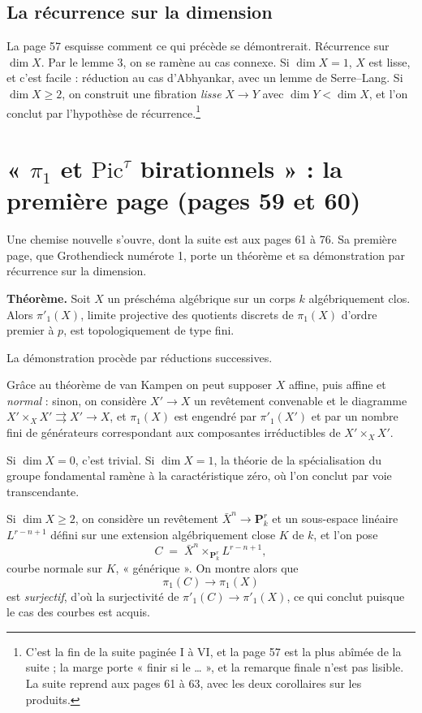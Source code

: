 \documentclass[11pt,a4paper]{article}
\begin{document}
\subsection*{La récurrence sur la dimension}

La page 57 esquisse comment ce qui précède se démontrerait. Récurrence sur
$\dim X$. Par le lemme 3, on se ramène au cas connexe. Si $\dim X = 1$, $X$ est
lisse, et c'est facile : réduction au cas d'Abhyankar, avec un lemme de
Serre--Lang. Si $\dim X \geqslant 2$, on construit une fibration \emph{lisse}
$X \to Y$ avec $\dim Y < \dim X$, et l'on conclut par l'hypothèse de
récurrence.\footnote{C'est la fin de la suite paginée I à VI, et la page 57 est la plus abîmée de la suite ; la marge porte « finir si le … », et la remarque
finale n'est pas lisible. La suite reprend aux pages 61 à 63, avec les
deux corollaires sur les produits.}

\section*{« $\pi_{1}$ et $\mathrm{Pic}^{\tau}$ birationnels » : la première page (pages 59 et 60)}

Une chemise nouvelle s'ouvre, dont la suite est aux pages 61 à 76. Sa première
page, que Grothendieck numérote 1, porte un théorème et sa démonstration
par récurrence sur la dimension.

\textbf{Théorème.} Soit $X$ un préschéma algébrique sur un corps $k$
algébriquement clos. Alors $\pi'_{1}(X)$, limite projective des quotients
discrets de $\pi_{1}(X)$ d'ordre premier à $p$, est topologiquement de type
fini.

La démonstration procède par réductions successives.

Grâce au théorème de van Kampen on peut supposer $X$ affine, puis affine et
\emph{normal} : sinon, on considère $X' \to X$ un revêtement convenable et le
diagramme $X' \times_{X} X' \rightrightarrows X' \to X$, et $\pi_{1}(X)$ est
engendré par $\pi'_{1}(X')$ et par un nombre fini de générateurs correspondant
aux composantes irréductibles de $X' \times_{X} X'$.

Si $\dim X = 0$, c'est trivial. Si $\dim X = 1$, la théorie de la
spécialisation du groupe fondamental ramène à la caractéristique zéro, où l'on
conclut par voie transcendante.

Si $\dim X \geqslant 2$, on considère un revêtement
$\bar{X}^{n} \to \mathbf{P}^{r}_{k}$ et un sous-espace linéaire $L^{r-n+1}$
défini sur une extension algébriquement close $K$ de $k$, et l'on pose
\[
  C \;=\; \bar{X}^{n} \times_{\mathbf{P}^{r}_{k}} L^{r-n+1} ,
\]
courbe normale sur $K$, « générique ». On montre alors que
\[
  \pi_{1}(C) \longrightarrow \pi_{1}(X)
\]
est \emph{surjectif}, d'où la surjectivité de $\pi'_{1}(C) \to \pi'_{1}(X)$, ce
qui conclut puisque le cas des courbes est acquis.
\end{document}
